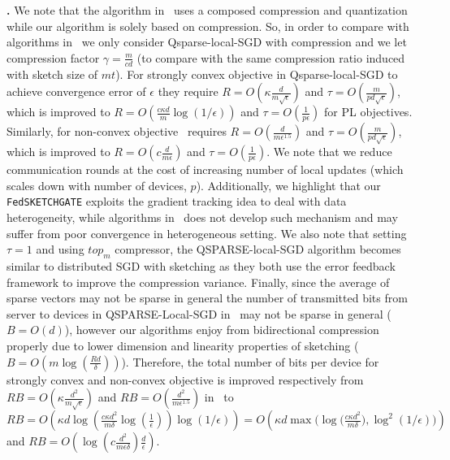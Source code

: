 \documentclass[sigconf, anonymous, review]{acmart}
\begin{document}
\noindent\textbf{\citep{basu2019qsparse}.}  We note that the algorithm in~\citep{basu2019qsparse} uses a composed compression and quantization while our algorithm is solely based on compression. 
So, in order to compare with algorithms in~\citep{basu2019qsparse} we only consider Qsparse-local-SGD with compression and we let compression factor $\gamma=\frac{m}{cd}$ (to compare with the same compression ratio induced with sketch size of $mt$). For strongly convex objective in   Qsparse-local-SGD to achieve convergence error of $\epsilon$ they require $R=O\left(\kappa\frac{d}{m\sqrt{\epsilon}}\right)$ and $\tau=O\left(\frac{m}{pd\sqrt{\epsilon}}\right)$, which is improved to $R=O\left(\frac{c\kappa d}{m}\log (1/\epsilon)\right)$ and $\tau=O\left(\frac{1}{p\epsilon}\right)$ for PL \:   objectives. Similarly, for non-convex objective~\citep{basu2019qsparse} requires $R=O\left(\frac{d}{m\epsilon^{1.5}}\right)$ and $\tau=O\left(\frac{m}{pd\sqrt{\epsilon}}\right)$, which is improved to $R=O\left(c\frac{d}{m\epsilon}\right)$ and $\tau=O\left(\frac{1}{p\epsilon}\right)$. We note that we reduce communication rounds at the cost of increasing number of local updates (which scales down with number of devices, $p$). Additionally, we highlight that our \texttt{FedSKETCHGATE} exploits the gradient tracking idea to deal with data heterogeneity, while algorithms in~\citep{basu2019qsparse} does not develop such mechanism and may suffer from poor convergence in heterogeneous setting. We also note that setting $\tau=1$ and using $top_{m}$ compressor, the QSPARSE-local-SGD algorithm becomes similar to distributed SGD with sketching as they both use the error feedback framework to improve the compression variance.  
Finally, since the average of sparse vectors may not be sparse in general the number of transmitted bits from server to devices in QSPARSE-Local-SGD in~\citep{basu2019qsparse} may not be sparse in general ($B=O(d)$), however our algorithms enjoy from bidirectional compression properly due to lower dimension and linearity properties of sketching ($B=O(m\log(\frac{Rd}{\delta}))$). Therefore, the total number of bits per device for strongly convex and non-convex objective is improved respectively from $RB=O\left(\kappa\frac{d^2}{m\sqrt{\epsilon}}\right)$ and $RB=O\left(\frac{d^2}{m\epsilon^{1.5}}\right)$ in~\citep{basu2019qsparse} to $RB=O\left({\kappa d\log(\frac{c\kappa d^2}{m\delta}\log (\frac{1}{\epsilon})) }\log (1/\epsilon)\right)=O\left({\kappa d\max\Big(\log(\frac{c\kappa d^2}{m\delta}}),\log^2 (1/\epsilon)\Big)\right)$ and $RB=O\left(\log(c\frac{d^2}{m\epsilon\delta})\frac{d}{\epsilon}\right)$.
\end{document}
